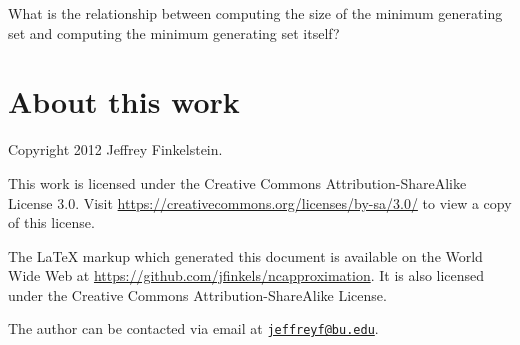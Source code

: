 \documentclass{article}
\newcommand{\email}[1]{\href{mailto:#1}{\nolinkurl{#1}}}
\begin{document}
What is the relationship between computing the size of the minimum generating set and computing the minimum generating set itself?

\section{About this work}

Copyright 2012 Jef{}frey Finkelstein.

This work is licensed under the Creative Commons Attribution-ShareAlike License 3.0.
Visit \mbox{\url{https://creativecommons.org/licenses/by-sa/3.0/}} to view a copy of this license.

The \LaTeX{} markup which generated this document is available on the World Wide Web at \mbox{\url{https://github.com/jfinkels/ncapproximation}}.
It is also licensed under the Creative Commons Attribution-ShareAlike License.

The author can be contacted via email at \email{jeffreyf@bu.edu}.



\end{document}
